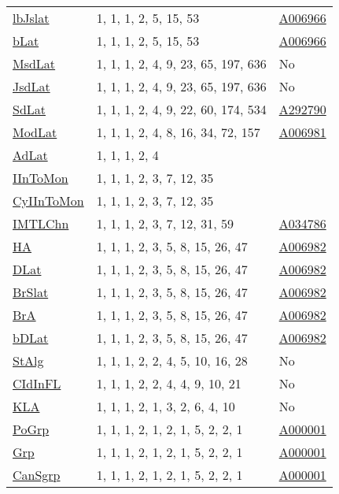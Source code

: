 {\begin{tabular}{|l|l|l|}
\hyperlink{lbJslat}{lbJslat}& 1, 1, 1, 2, 5, 15, 53 &\href{http://oeis.org/A006966}{A006966}\\
\hyperlink{bLat}{bLat}& 1, 1, 1, 2, 5, 15, 53 &\href{http://oeis.org/A006966}{A006966}\\
\hyperlink{MsdLat}{MsdLat}& 1, 1, 1, 2, 4, 9, 23, 65, 197, 636 &No\\
\hyperlink{JsdLat}{JsdLat}& 1, 1, 1, 2, 4, 9, 23, 65, 197, 636 &No\\
\hyperlink{SdLat}{SdLat}& 1, 1, 1, 2, 4, 9, 22, 60, 174, 534 &\href{http://oeis.org/A292790}{A292790}\\
\hyperlink{ModLat}{ModLat}& 1, 1, 1, 2, 4, 8, 16, 34, 72, 157 &\href{http://oeis.org/A006981}{A006981}\\
\hyperlink{AdLat}{AdLat}& 1, 1, 1, 2, 4 &\\
\hyperlink{IInToMon}{IInToMon}& 1, 1, 1, 2, 3, 7, 12, 35 &\\
\hyperlink{CyIInToMon}{CyIInToMon}& 1, 1, 1, 2, 3, 7, 12, 35 &\\
\hyperlink{IMTLChn}{IMTLChn}& 1, 1, 1, 2, 3, 7, 12, 31, 59 &\href{http://oeis.org/A034786}{A034786}\\
\hyperlink{HA}{HA}& 1, 1, 1, 2, 3, 5, 8, 15, 26, 47 &\href{http://oeis.org/A006982}{A006982}\\
\hyperlink{DLat}{DLat}& 1, 1, 1, 2, 3, 5, 8, 15, 26, 47 &\href{http://oeis.org/A006982}{A006982}\\
\hyperlink{BrSlat}{BrSlat}& 1, 1, 1, 2, 3, 5, 8, 15, 26, 47 &\href{http://oeis.org/A006982}{A006982}\\
\hyperlink{BrA}{BrA}& 1, 1, 1, 2, 3, 5, 8, 15, 26, 47 &\href{http://oeis.org/A006982}{A006982}\\
\hyperlink{bDLat}{bDLat}& 1, 1, 1, 2, 3, 5, 8, 15, 26, 47 &\href{http://oeis.org/A006982}{A006982}\\
\hyperlink{StAlg}{StAlg}& 1, 1, 1, 2, 2, 4, 5, 10, 16, 28 &No\\
\hyperlink{CIdInFL}{CIdInFL}& 1, 1, 1, 2, 2, 4, 4, 9, 10, 21 &No\\
\hyperlink{KLA}{KLA}& 1, 1, 1, 2, 1, 3, 2, 6, 4, 10 &No\\
\hyperlink{PoGrp}{PoGrp}& 1, 1, 1, 2, 1, 2, 1, 5, 2, 2, 1 &\href{http://oeis.org/A000001}{A000001}\\
\hyperlink{Grp}{Grp}& 1, 1, 1, 2, 1, 2, 1, 5, 2, 2, 1 &\href{http://oeis.org/A000001}{A000001}\\
\hyperlink{CanSgrp}{CanSgrp}& 1, 1, 1, 2, 1, 2, 1, 5, 2, 2, 1 &\href{http://oeis.org/A000001}{A000001}\\

\end{tabular}}
